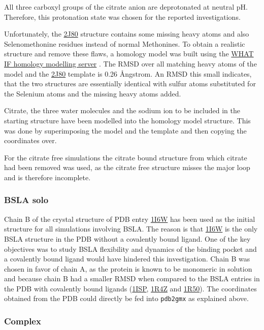 \documentclass[english, a4paper, 12pt, titlepage, draft]{article}
\newcommand{\PDB}[1]{\href{http://pdb.rcsb.org/pdb/explore/explore.do?structureId=#1}{#1}}
\begin{document}
All three carboxyl groups of the citrate anion are deprotonated at neutral pH.
Therefore, this protonation state was chosen for the reported investigations.

Unfortunately, the \PDB{2J80} structure contains some missing heavy atoms and also Selenomethonine residues instead of normal Methonines.
To obtain a realistic structure and remove these flaws, a homology model was built using the \href{http://swift.cmbi.ru.nl/servers/html/index.html}{WHAT IF homology modelling server} \cite{WHATIFhomologyModel}.
The RMSD over all matching heavy atoms of the model and the \PDB{2J80} template is 0.26 \r{A}ngstrom.
An RMSD this small indicates, that the two structures are essentially identical with sulfur atoms substituted for the Selenium atoms and the missing heavy atoms added.

Citrate, the three water molecules and the sodium ion to be included in the starting structure have been modelled into the homology model structure.
This was done by superimposing the model and the template and then copying the coordinates over.

For the citrate free simulations the citrate bound structure from which citrate had been removed was used, as the citrate free structure misses the major loop and is therefore incomplete.

\subsubsection{BSLA solo}

Chain B of the crystal structure of PDB entry \PDB{1I6W} has been used as the initial structure for all simulations involving BSLA.
The reason is that \PDB{1I6W} is the only BSLA structure in the PDB without a covalently bound ligand.
One of the key objectives was to study BSLA flexibility and dynamics of the binding pocket and a covalently bound ligand would have hindered this investigation.
Chain B was chosen in favor of chain A, as the protein is known to be monomeric in solution and because chain B had a smaller RMSD when compared to the BSLA entries in the PDB with covalently bound ligands (\PDB{1ISP}, \PDB{1R4Z} and \PDB{1R50}).
The coordinates obtained from the PDB could directly be fed into \texttt{pdb2gmx} as explained above.


\subsubsection{Complex}
\end{document}
